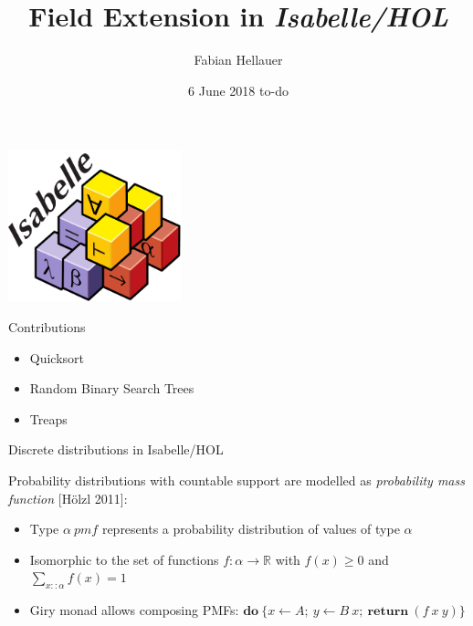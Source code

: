 \documentclass[%
	sans,
	12pt,
]{beamer}
\title{Field Extension in \emph{Isabelle/HOL} \vspace*{-0.5em}}
\author{\normalsize Fabian Hellauer}
\institute[]{\footnotesize Technische Universität München}
\date{\footnotesize 6 June 2018 to-do}
\newcommand{\high}[1]{{\usebeamercolor[fg]{structure} #1}}
\begin{document}
\maketitle

\begin{frame}
\begin{center}
\includegraphics[width=5cm]{isabelle.pdf}
\end{center}
\end{frame}


\newcommand{\pivot}[1]{{\color{red}#1}}
\newcommand{\ltpiv}[1]{{\color{blue}#1}}
\newcommand{\gtpiv}[1]{{\color{olive}#1}}

\begin{frame}{Contributions}
\begin{itemize}
\item Quicksort\pause
\item Random Binary Search Trees\pause
\item Treaps
\end{itemize}
\end{frame}

\begin{frame}
\begin{center}
\huge\high{Discrete distributions in Isabelle/HOL}
\end{center}
\end{frame}

\begin{frame}
Probability distributions with countable support are modelled as \emph{probability mass function} [Hölzl 2011]:\pause
\begin{itemize}
\item Type $\alpha\ \textit{pmf}$ represents a probability distribution of values of type $\alpha$\pause
\item Isomorphic to the set of functions $f : \alpha\to\mathbb{R}$ with $f(x) \geq 0$ and $\sum_{x :: \alpha} f(x) = 1$\pause
\item Giry monad allows composing PMFs: $\textbf{do}\ \{x\leftarrow A;\ y \leftarrow B\ x;\ \textbf{return}\ (f\ x\ y)\}$
\end{itemize}
\end{frame}
\end{document}
